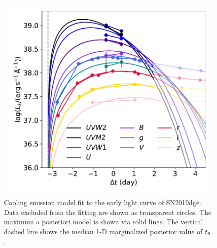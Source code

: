 \documentclass[twocolumn]{aastex63}
\newcommand{\name}{SN2019dge}
\begin{document}
\begin{CJK*}{UTF8}{gbsn}
\begin{figure}[htbp!]
	\centering
	\includegraphics[width=\columnwidth]{figures/P15model.pdf}
	\caption{Cooling emission model fit to the early light curve of \name. 
		Data excluded from the fitting are shown as transparent circles. 
		The maximum a posteriori model is shown via solid lines.
		The vertical dashed line shows the median 1-D marginalized posterior value of
		$t_{\rm fl}$.
		\label{fig:piromodel}}
\end{figure}




\end{CJK*}
\end{document}
